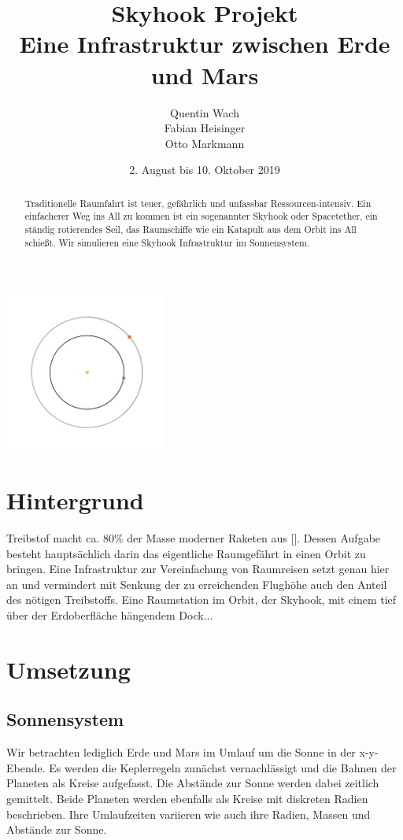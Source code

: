 \documentclass{article}
\title{ \textbf{Skyhook Projekt} \\ \textmd{Eine Infrastruktur zwischen Erde und Mars}}  %
\author{
  Quentin Wach \\
  Fabian Heisinger \\
  Otto Markmann
  \date{2. August bis 10. Oktober 2019}
}
\begin{document}
\maketitle
\begin{abstract}
Traditionelle Raumfahrt ist teuer, gefährlich und unfassbar Ressourcen-intensiv. Ein einfacherer Weg  ins All zu kommen ist ein sogenannter Skyhook oder Spacetether,  ein ständig rotierendes Seil, das Raumschiffe wie ein Katapult aus dem Orbit ins All schießt. Wir simulieren eine Skyhook Infrastruktur im Sonnensystem.
\end{abstract}
\begin{center} 
	\includegraphics[width=200px]{../Abb/Abb_1.png}	
\end{center}
\section{Hintergrund}
Treibstof macht ca. 80$\%$ der Masse moderner Raketen aus []. Dessen Aufgabe besteht hauptsächlich darin das eigentliche Raumgefährt in einen Orbit zu bringen. Eine Infrastruktur zur Vereinfachung von Raumreisen setzt genau hier an und vermindert mit Senkung der zu erreichenden Flughöhe auch den Anteil des nötigen Treibstoffs. Eine Raumstation im Orbit, der Skyhook, mit einem tief über der Erdoberfläche hängendem Dock...

\section{Umsetzung}
\subsection{Sonnensystem}
Wir betrachten lediglich Erde und Mars im Umlauf um die Sonne in der x-y-Ebende. Es werden die Keplerregeln zunächst vernachlässigt und die Bahnen der Planeten als Kreise aufgefasst. Die Abstände zur Sonne werden dabei zeitlich gemittelt. Beide Planeten werden ebenfalls als Kreise mit diskreten Radien beschrieben. Ihre Umlaufzeiten variieren wie auch ihre Radien, Massen und Abstände zur Sonne. 
\end{document}
